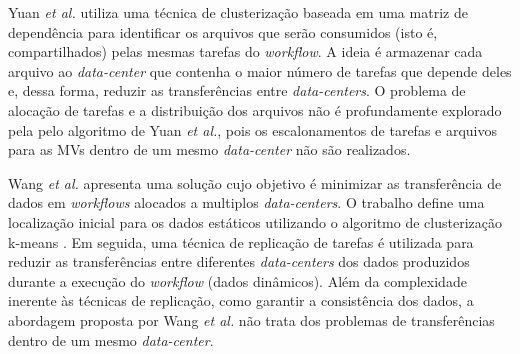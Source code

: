 Yuan \textit{et al.} \cite{Yuan2010} utiliza uma técnica de clusterização \cite{Broder} baseada em uma matriz de dependência para identificar os arquivos que serão consumidos (isto é, compartilhados) pelas mesmas tarefas do \textit{workflow}. A ideia é armazenar cada arquivo ao \textit{data-center} que contenha o maior número de tarefas que depende deles e, dessa forma, reduzir as transferências entre \textit{data-centers}. O problema de alocação de tarefas e a distribuição dos arquivos não é profundamente explorado pela pelo algoritmo de Yuan \textit{et al.}, pois os escalonamentos de tarefas e arquivos para as MVs dentro de um mesmo \textit{data-center} não são realizados.


Wang \textit{et al.} \cite{Wang2014} apresenta uma solução cujo objetivo é minimizar as transferência de dados em \textit{workflows} alocados a multiplos \textit{data-centers}. O trabalho define uma localização inicial para os dados estáticos utilizando o algoritmo de clusterização k-means \cite{Broder}. Em seguida, uma técnica de replicação de tarefas é utilizada para reduzir as transferências entre diferentes \textit{data-centers} dos dados produzidos durante a execução do \textit{workflow} (dados dinâmicos). Além da complexidade inerente às técnicas de replicação, como garantir a consistência dos dados, a abordagem proposta por Wang \textit{et al.} não trata dos problemas de transferências dentro de um mesmo \textit{data-center}.


